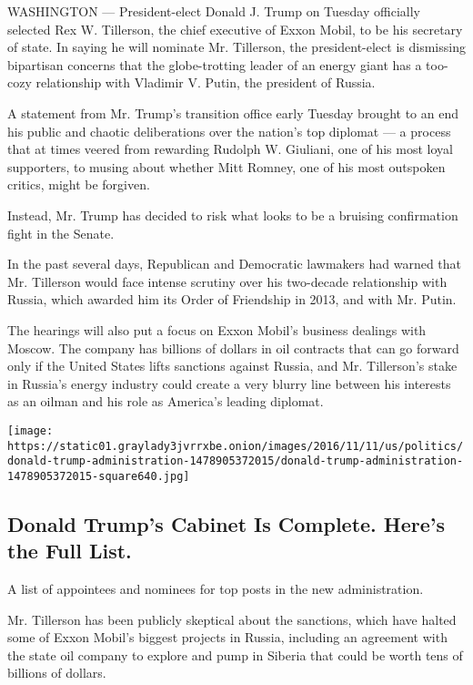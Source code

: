 WASHINGTON --- President-elect Donald J. Trump on Tuesday officially
selected Rex W. Tillerson, the chief executive of Exxon Mobil, to be his
secretary of state. In saying he will nominate Mr. Tillerson, the
president-elect is dismissing bipartisan concerns that the
globe-trotting leader of an energy giant has a too-cozy relationship
with Vladimir V. Putin, the president of Russia.

A statement from Mr. Trump's transition office early Tuesday brought to
an end his public and chaotic deliberations over the nation's top
diplomat --- a process that at times veered from rewarding Rudolph W.
Giuliani, one of his most loyal supporters, to musing about whether Mitt
Romney, one of his most outspoken critics, might be forgiven.

Instead, Mr. Trump has decided to risk what looks to be a bruising
confirmation fight in the Senate.

In the past several days, Republican and Democratic lawmakers had warned
that Mr. Tillerson would face intense scrutiny over his two-decade
relationship with Russia, which awarded him its Order of Friendship in
2013, and with Mr. Putin.

The hearings will also put a focus on Exxon Mobil's business dealings
with Moscow. The company has billions of dollars in oil contracts that
can go forward only if the United States lifts sanctions against Russia,
and Mr. Tillerson's stake in Russia's energy industry could create a
very blurry line between his interests as an oilman and his role as
America's leading diplomat.

\href{https://www.nytimes3xbfgragh.onion/interactive/2016/us/politics/donald-trump-administration.html}{}

\texttt{[image: https://static01.graylady3jvrrxbe.onion/images/2016/11/11/us/politics/donald-trump-administration-1478905372015/donald-trump-administration-1478905372015-square640.jpg]}

\hypertarget{donald-trumps-cabinet-is-complete-heres-the-full-list}{%
\subsection{Donald Trump's Cabinet Is Complete. Here's the Full
List.}\label{donald-trumps-cabinet-is-complete-heres-the-full-list}}

A list of appointees and nominees for top posts in the new
administration.

Mr. Tillerson has been publicly skeptical about the sanctions, which
have halted some of Exxon Mobil's biggest projects in Russia, including
an agreement with the state oil company to explore and pump in Siberia
that could be worth tens of billions of dollars.

